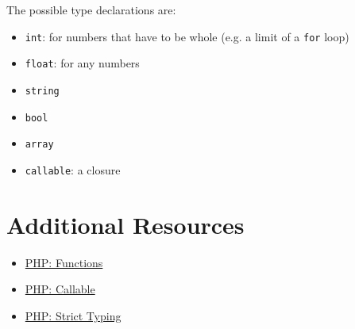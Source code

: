 The possible type declarations are:

\begin{itemize}
    \item \texttt{int}: for numbers that have to be whole (e.g. a limit of a \texttt{for} loop)
    \item \texttt{float}: for any numbers
    \item \texttt{string}
    \item \texttt{bool}
    \item \texttt{array}
    \item \texttt{callable}: a closure
\end{itemize}


\section{Additional Resources}

\begin{itemize}[leftmargin=*]
    \item \href{http://www.php.net/manual/en/functions.user-defined.php}{PHP: Functions}
    \item \href{http://www.php.net/manual/en/language.types.callable.php}{PHP: Callable}
    \item \href{http://www.php.net/manual/en/functions.arguments.php#functions.arguments.type-declaration.strict}{PHP: Strict Typing}
\end{itemize}
